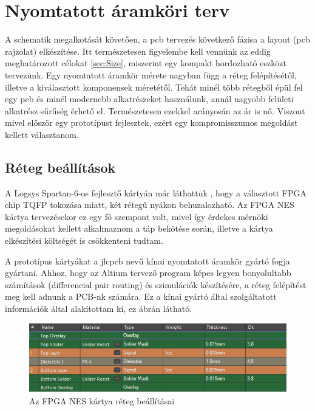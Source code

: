 \section{Nyomtatott áramköri terv}

A schematik megalkotását követően, a pcb tervezés következő fázisa a layout (pcb rajzolat) elkészítése. Itt természetesen figyelembe kell vennünk az eddig meghatározott célokat \ref{sec:Size}, miszerint egy kompakt hordozható eszközt tervezünk. Egy nyomtatott áramkör mérete nagyban függ a réteg felépítésétől, illetve a kiválasztott komponensek méretétől. Tehát minél több rétegből épül fel egy pcb és minél modernebb alkatrészeket használunk, annál nagyobb felületi alkatrész sűrűség érhető el. Természetesen ezekkel arányosán az ár is nő. Viszont mivel először egy prototípust fejlesztek, ezért egy kompromisszumos megoldást kellett választanom.   
		
	\subsection{Réteg beállítások}
	
	A Logsys Spartan-6-os fejlesztő kártyán már láthattuk \cite{spatan6}, hogy a választott FPGA chip TQFP tokozása miatt, két rétegű nyákon behuzalozható. Az FPGA NES kártya tervezésekor ez egy fő szempont volt, mivel így érdekes mérnöki megoldásokat kellett alkalmaznom a táp bekötése során, illetve a kártya elkészítési költségét is csökkenteni tudtam.
	
	A prototípus kártyákat a jlcpcb nevű kínai nyomtatott áramkör gyártó fogja gyártani. Ahhoz, hogy az Altium tervező program képes legyen bonyolultabb számítások (differencial pair routing) és szimulációk készítésére, a réteg felépítést meg kell adnunk a PCB-nk számára. Ez a kínai gyártó által szolgáltatott információk által \cite{jlcpcb} alakítottam ki, ez  ábrán látható.    
	
	\begin{figure}[H]
		\centering
		\includegraphics[width=150mm, keepaspectratio]{figures/Layer-stackup}
		\caption{Az FPGA NES kártya réteg beállításai}
		\label{fig:Layer-stackup}
	\end{figure}
	
